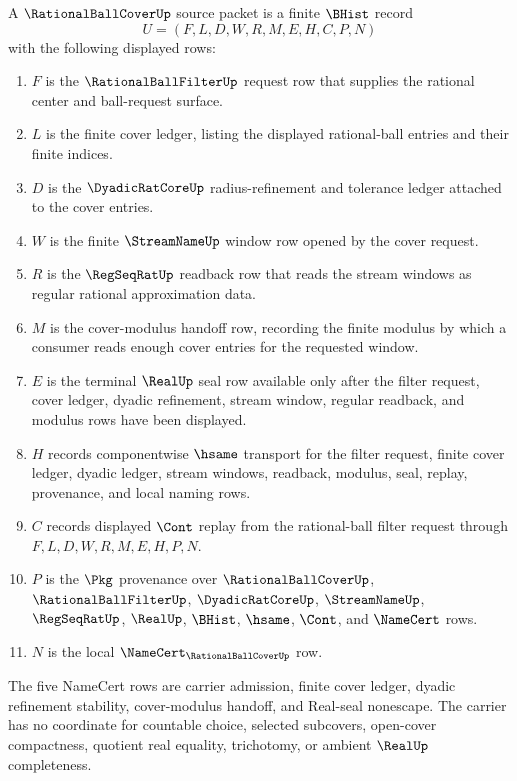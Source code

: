 \begin{definition}
\label{def:choice-free-rational-ball-cover-source}
A $\RationalBallCoverUp$ source packet is a finite $\BHist$ record
$$
U=(F,L,D,W,R,M,E,H,C,P,N)
$$
with the following displayed rows:
\begin{enumerate}
\item $F$ is the $\RationalBallFilterUp$ request row that supplies the rational center and ball-request surface.
\item $L$ is the finite cover ledger, listing the displayed rational-ball entries and their finite indices.
\item $D$ is the $\DyadicRatCoreUp$ radius-refinement and tolerance ledger attached to the cover entries.
\item $W$ is the finite $\StreamNameUp$ window row opened by the cover request.
\item $R$ is the $\RegSeqRatUp$ readback row that reads the stream windows as regular rational approximation data.
\item $M$ is the cover-modulus handoff row, recording the finite modulus by which a consumer reads enough cover entries for the requested window.
\item $E$ is the terminal $\RealUp$ seal row available only after the filter request, cover ledger, dyadic refinement, stream window, regular readback, and modulus rows have been displayed.
\item $H$ records componentwise $\hsame$ transport for the filter request, finite cover ledger, dyadic ledger, stream windows, readback, modulus, seal, replay, provenance, and local naming rows.
\item $C$ records displayed $\Cont$ replay from the rational-ball filter request through $F,L,D,W,R,M,E,H,P,N$.
\item $P$ is the $\Pkg$ provenance over $\RationalBallCoverUp$, $\RationalBallFilterUp$, $\DyadicRatCoreUp$, $\StreamNameUp$, $\RegSeqRatUp$, $\RealUp$, $\BHist$, $\hsame$, $\Cont$, and $\NameCert$ rows.
\item $N$ is the local $\NameCert_{\RationalBallCoverUp}$ row.
\end{enumerate}
The five NameCert rows are carrier admission, finite cover ledger, dyadic refinement stability, cover-modulus handoff, and Real-seal nonescape. The carrier has no coordinate for countable choice, selected subcovers, open-cover compactness, quotient real equality, trichotomy, or ambient $\RealUp$ completeness.
\end{definition}

